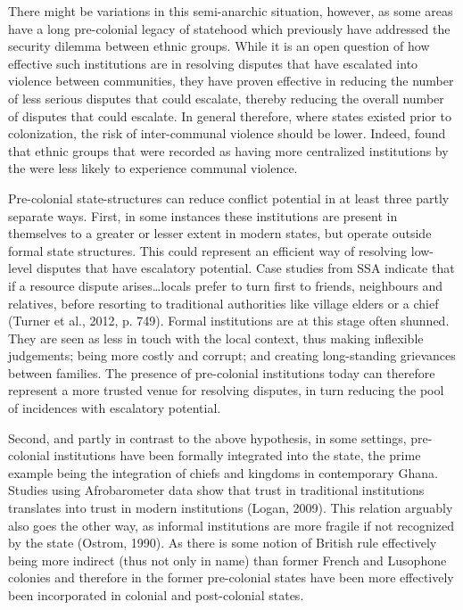 \documentclass[12pt]{article}
\begin{document}
There might be variations in this semi-anarchic situation, however, as some
areas have a long pre-colonial legacy of statehood which previously have
addressed the security dilemma between ethnic groups. While it is an open
question of how effective such institutions are in resolving disputes that have
escalated into violence between communities, they have proven effective in
reducing the number of less serious disputes that could escalate, thereby
reducing the overall number of disputes that could escalate. In general
therefore, where states existed prior to colonization, the risk of
inter-communal violence should be lower. Indeed, \citet{Wig2018} found that
ethnic groups that were recorded as having more centralized institutions by the
\citet{Murdock1967} were less likely to experience communal violence.

Pre-colonial state-structures can reduce conflict potential in at least three
partly separate ways. First, in some instances these institutions are present in
themselves to a greater or lesser extent in modern states, but operate outside
formal state structures. This could represent an efficient way of resolving
low-level disputes that have escalatory potential.  Case studies from SSA
indicate that if a resource dispute arises…locals prefer to turn first to
friends, neighbours and relatives, before resorting to traditional authorities
like village elders or a chief (Turner et al., 2012, p.  749). Formal
institutions are at this stage often shunned. They are seen as less in touch
with the local context, thus making inflexible judgements; being more costly and
corrupt; and creating long-standing grievances between families.  The presence
of pre-colonial institutions today can therefore represent a more trusted venue
for resolving disputes, in turn reducing the pool of incidences with escalatory
potential.  

Second, and partly in contrast to the above hypothesis, in some settings,
pre-colonial institutions have been formally integrated into the state, the
prime example being the integration of chiefs and kingdoms in contemporary
Ghana. Studies using Afrobarometer data show that trust in traditional
institutions translates into trust in modern institutions (Logan, 2009). This
relation arguably also goes the other way, as informal institutions are more
fragile if not recognized by the state (Ostrom, 1990). As there is some notion
of British rule effectively being more indirect (thus not only in name) than
former French and Lusophone colonies and therefore in the former pre-colonial
states have been more effectively been incorporated in colonial and
post-colonial states. 
\end{document}
